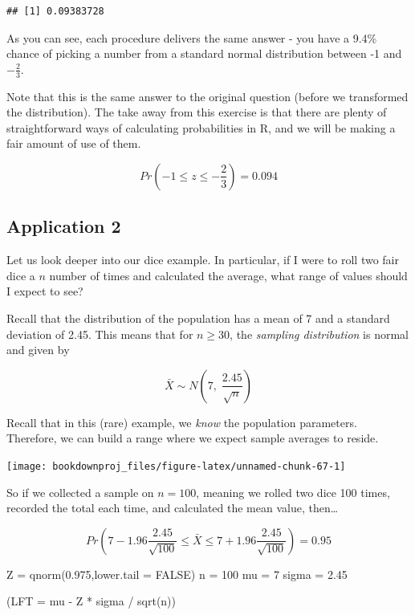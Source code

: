 \documentclass[
]{book}
\newenvironment{Shaded}{\begin{snugshade}}{\end{snugshade}}
\newcommand{\AttributeTok}[1]{\textcolor[rgb]{0.77,0.63,0.00}{#1}}
\newcommand{\ConstantTok}[1]{\textcolor[rgb]{0.00,0.00,0.00}{#1}}
\newcommand{\DecValTok}[1]{\textcolor[rgb]{0.00,0.00,0.81}{#1}}
\newcommand{\FloatTok}[1]{\textcolor[rgb]{0.00,0.00,0.81}{#1}}
\newcommand{\FunctionTok}[1]{\textcolor[rgb]{0.00,0.00,0.00}{#1}}
\newcommand{\NormalTok}[1]{#1}
\newcommand{\OtherTok}[1]{\textcolor[rgb]{0.56,0.35,0.01}{#1}}
\newcommand{\SpecialCharTok}[1]{\textcolor[rgb]{0.00,0.00,0.00}{#1}}
\begin{document}
\begin{verbatim}
## [1] 0.09383728
\end{verbatim}

As you can see, each procedure delivers the same answer - you have a 9.4\% chance of picking a number from a standard normal distribution between -1 and \(-\frac{2}{3}\).

Note that this is the same answer to the original question (before we transformed the distribution). The take away from this exercise is that there are plenty of straightforward ways of calculating probabilities in R, and we will be making a fair amount of use of them.

\[Pr\left(-1 \leq z \leq -\frac{2}{3}\right)=0.094\]

\hypertarget{application-2}{%
\subsection{Application 2}\label{application-2}}

Let us look deeper into our dice example. In particular, if I were to roll two fair dice a \(n\) number of times and calculated the average, what range of values should I expect to see?

Recall that the distribution of the population has a mean of 7 and a standard deviation of 2.45. This means that for \(n \geq 30\), the \emph{sampling distribution} is normal and given by

\[\bar{X} \sim N \left( 7, \; \frac{2.45}{\sqrt{n}} \right)\]

Recall that in this (rare) example, we \emph{know} the population parameters. Therefore, we can build a range where we expect sample averages to reside.

\begin{center}\texttt{[image: bookdownproj\_files/figure-latex/unnamed-chunk-67-1]} \end{center}

So if we collected a sample on \(n=100\), meaning we rolled two dice 100 times, recorded the total each time, and calculated the mean value, then\ldots{}

\[Pr\left( 7-1.96 \frac{2.45}{\sqrt{100}} \leq \bar{X} \leq 7+1.96 \frac{2.45}{\sqrt{100}} \right) = 0.95\]

\begin{Shaded}
\begin{Highlighting}[]
\NormalTok{Z }\OtherTok{=} \FunctionTok{qnorm}\NormalTok{(}\FloatTok{0.975}\NormalTok{,}\AttributeTok{lower.tail =} \ConstantTok{FALSE}\NormalTok{)}
\NormalTok{n }\OtherTok{=} \DecValTok{100}
\NormalTok{mu }\OtherTok{=} \DecValTok{7}
\NormalTok{sigma }\OtherTok{=} \FloatTok{2.45}

\NormalTok{(}\AttributeTok{LFT =}\NormalTok{ mu }\SpecialCharTok{{-}}\NormalTok{ Z }\SpecialCharTok{*}\NormalTok{ sigma }\SpecialCharTok{/} \FunctionTok{sqrt}\NormalTok{(n))}
\end{Highlighting}
\end{Shaded}
\end{document}
